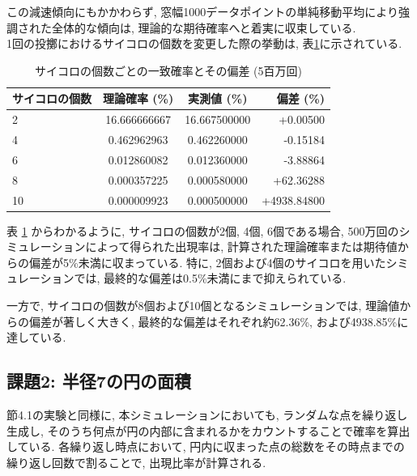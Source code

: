 \documentclass[a4j, 12pt ]{jarticle}
\begin{document}
この減速傾向にもかかわらず, 窓幅1000データポイントの単純移動平均により強調された全体的な傾向は, 理論的な期待確率へと着実に収束している.\\

1回の投擲におけるサイコロの個数を変更した際の挙動は, 表\ref{tab:n_dice_throw_simulation}に示されている.\\

\begin{table}[H]
  \centering
  \caption{サイコロの個数ごとの一致確率とその偏差 (5百万回)}\label{tab:n_dice_throw_simulation}
  \begin{tabular}{@{}lccr@{}}
    \toprule
    サイコロの個数 & 理論確率 (\%) & 実測値 (\%) & 偏差 (\%) \\
    \midrule
    2  & 16.666666667 & 16.667500000 & +0.00500 \\
    4  & 0.462962963  & 0.462260000  & -0.15184 \\
    6  & 0.012860082  & 0.012360000  & -3.88864 \\
    8  & 0.000357225  & 0.000580000  & +62.36288 \\
    10 & 0.000009923  & 0.000500000  & +4938.84800 \\
    \bottomrule
  \end{tabular}
\end{table}
表 \ref{tab:n_dice_throw_simulation} からわかるように, サイコロの個数が2個, 4個, 6個である場合, 500万回のシミュレーションによって得られた出現率は, 計算された理論確率または期待値からの偏差が5\%未満に収まっている. 特に, 2個および4個のサイコロを用いたシミュレーションでは, 最終的な偏差は0.5\%未満にまで抑えられている.

一方で, サイコロの個数が8個および10個となるシミュレーションでは, 理論値からの偏差が著しく大きく, 最終的な偏差はそれぞれ約62.36\%, および4938.85\%に達している.
\subsection{課題2: 半径7の円の面積}
節4.1の実験と同様に, 本シミュレーションにおいても, ランダムな点を繰り返し生成し, そのうち何点が円の内部に含まれるかをカウントすることで確率を算出している. 各繰り返し時点において, 円内に収まった点の総数をその時点までの繰り返し回数で割ることで, 出現比率が計算される.
\end{document}
